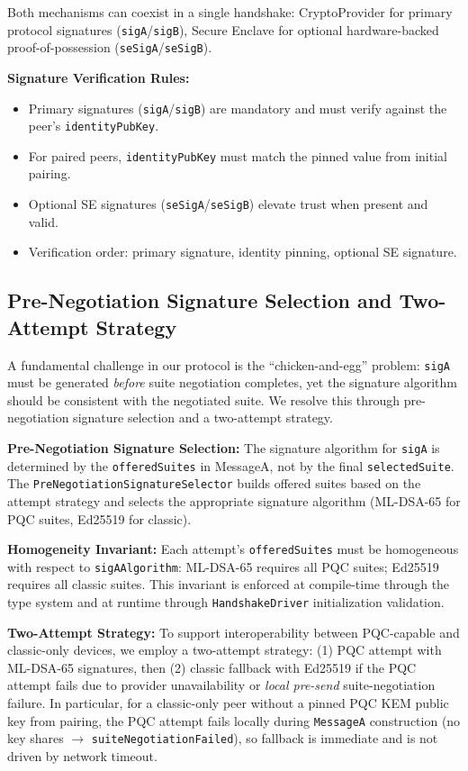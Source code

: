 \documentclass[10pt,journal,compsoc]{IEEEtran}
\providecommand{\tightlist}{%
	  \setlength{\itemsep}{0pt}\setlength{\parskip}{0pt}}
\begin{document}
Both mechanisms can coexist in a single handshake: CryptoProvider for
primary protocol signatures (\texttt{sigA}/\texttt{sigB}), Secure
Enclave for optional hardware-backed proof-of-possession
(\texttt{seSigA}/\texttt{seSigB}).

\textbf{Signature Verification Rules:}
\begin{itemize}\tightlist
\item
  Primary signatures (\texttt{sigA}/\texttt{sigB}) are mandatory and must
  verify against the peer's \texttt{identityPubKey}.
\item
  For paired peers, \texttt{identityPubKey} must match the pinned value
  from initial pairing.
\item
  Optional SE signatures (\texttt{seSigA}/\texttt{seSigB}) elevate trust
  when present and valid.
\item
  Verification order: primary signature, identity pinning, optional SE
  signature.
\end{itemize}

\subsection*{Pre-Negotiation Signature Selection and Two-Attempt Strategy}

A fundamental challenge in our protocol is the ``chicken-and-egg''
problem: \texttt{sigA} must be generated \emph{before} suite negotiation
completes, yet the signature algorithm should be consistent with the
negotiated suite. We resolve this through pre-negotiation signature
selection and a two-attempt strategy.

\textbf{Pre-Negotiation Signature Selection:}
The signature algorithm for \texttt{sigA} is determined by the
\texttt{offeredSuites} in MessageA, not by the final
\texttt{selectedSuite}. The \texttt{Pre\allowbreak Negotiation\allowbreak Signature\allowbreak Selector}
builds offered suites based on the attempt strategy and selects the
appropriate signature algorithm (ML-DSA-65 for PQC suites, Ed25519 for
classic).

\textbf{Homogeneity Invariant:} Each attempt's \texttt{offeredSuites} must
be homogeneous with respect to \texttt{sigAAlgorithm}: ML-DSA-65
requires all PQC suites; Ed25519 requires all classic suites. This
invariant is enforced at compile-time through the type system and at
runtime through \texttt{HandshakeDriver} initialization validation.

\textbf{Two-Attempt Strategy:}
To support interoperability between PQC-capable and classic-only
devices, we employ a two-attempt strategy: (1) PQC attempt with ML-DSA-65
signatures, then (2) classic fallback with Ed25519 if the PQC attempt
fails due to provider unavailability or \emph{local pre-send}
suite-negotiation failure. In
particular, for a classic-only peer without a pinned PQC KEM public key
from pairing, the PQC attempt fails locally during \texttt{MessageA}
construction (no key shares $\rightarrow$ \texttt{suiteNegotiationFailed}),
so fallback is immediate and is not driven by network timeout.
\end{document}
